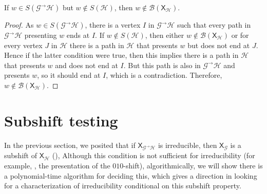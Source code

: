 \documentclass[hidelinks]{report}
\newcommand{\Gc}{\mathcal{G}}  %
\newcommand{\Hc}{\mathcal{H}}  %
\newcommand{\Bc}{\mathcal{B}}
\newcommand{\GtH}{{\Gc^\to\Hc}}
\newcommand{\shift}[1]{\mathsf{X}_{#1}}
\theoremstyle{definition}
\begin{document}
\begin{proposition}
    If \(w \in S(\GtH)\) but \(w \notin S(\Hc)\), then \(w \notin \Bc(\shift{\Hc})\). 
\end{proposition}

\begin{proof}
    As \(w \in S(\GtH)\), there is a vertex \(I\) in \(\GtH\) such that every path in 
    \(\GtH\) presenting \(w\) ends at \(I\).
    If \(w \notin S(\Hc)\), then either 
    \(w \notin \Bc(\shift{\Hc})\) or for every vertex \(J\) in \(\Hc\) there is a path
    in \(\Hc\) that presents \(w\) but does not end at \(J\). Hence if the latter 
    condition were true, then this implies there is a path in \(\Hc\) that presents \(w\) 
    and does not end at \(I\). But this path is also in \(\GtH\) and presents \(w\), so it 
    should end at \(I\), which is a contradiction. Therefore, \(w \notin \Bc(\shift{\Hc})\).
\end{proof}



\chapter{Subshift testing}

In the previous section, we posited that if \(\shift{\GtH}\) is irreducible, then \(\shift{\Gc}\) is a subshift of \(\shift{\Hc}\) (),
Although this condition is not sufficient for irreducibility (for example, , the presentation of the \(010\)-shift), algorithmically, we will show there is a 
polynomial-time algorithm for deciding this, which gives a direction in looking for 
a characterization of irreducibility conditional on this subshift property.
\end{document}
